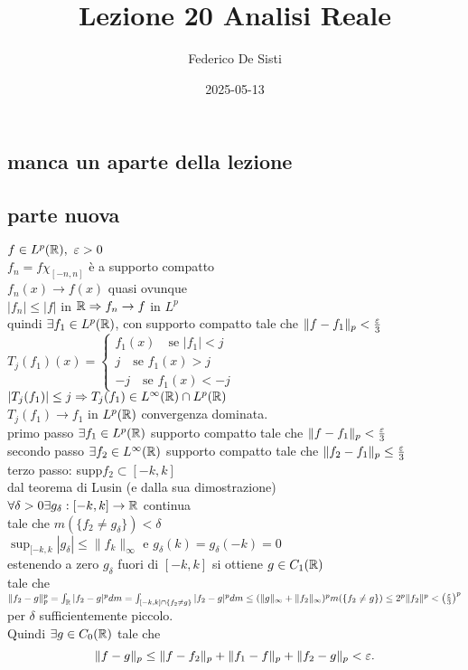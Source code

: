 \documentclass[12px]{article}
\title{Lezione 20 Analisi Reale}
\date{2025-05-13}
\author{Federico De Sisti}
\begin{document}
	\maketitle
	\newpage
	\subsection{manca un aparte della lezione}
	\subsection{parte nuova}
	\begin{dimo}
		$f\in L^p(\mathbb{R}), \ \varepsilon > 0 $\\
		$f_n = f\chi_{[-n,n]}$ è a supporto compatto\\
		 $f_n(x) \rightarrow f(x)$ quasi ovunque\\
		 $|f_n| \leq |f|$ in  $\mathbb{R} \Rightarrow  f_n \rightarrow f$ in $L^p$\\
		 quindi  $\exists  f_1\in L^p(\mathbb{R})$, con supporto compatto tale che $\|f-f_1\|_p < \frac {\varepsilon} 3$ \\
		 $T_j(f_1)(x) = \begin{cases}
			 f_1 (x)\ \ \ \text{ se } |f_1| < j\\
			 j \ \ \ \text{ se } f_1(x) > j\\
			 -j \ \ \ \text{ se } f_1(x) < -j
		 \end{cases}$\\
		 $|T_j(f_1)|\leq j \Rightarrow  T_j (f_1)\in L^\infty (\mathbb{R})\cap L^p(\mathbb{R})$ \\
		 $T_j(f_1) \rightarrow f_1$ in $L^p(\mathbb{R})$ convergenza dominata.\\
		 primo passo  $\exists f_1\in L^p(\mathbb{R})$ supporto compatto tale che $\|f-f_1\|_p < \frac {\varepsilon} 3$\\
		 secondo passo $\exists f_2 \in L^\infty(\mathbb{R})$ supporto compatto tale che $\|f_2- f_1\|_p \leq \frac{\varepsilon} 3$\\
		 terzo passo: supp$f_2\subset [-k,k]$\\
		 dal teorema di Lusin (e dalla sua dimostrazione)\\
		 $\forall \delta > 0 \exists g_\delta : [-k,k] \rightarrow \mathbb{R}$ continua\\
	 tale che $m(\{f_2\neq g_\delta\}) < \delta$\\
	 $\sup_{[-k,k}|g_\delta|\leq \|f_k\|_\infty$ e  $g_\delta(k) = g_\delta(-k) = 0$\\
	 estenendo a zero $g_\delta$ fuori di  $[-k,k]$ si ottiene  $g\in C_1(\mathbb{R})$\\
	 tale che $\|f_2 - g\|_p^p = \int_{\mathbb{R}} |f_2-g|^pd m = \int_{[-k,k]\cap\{f_2\neq g\}}|f_2-g|^pd m \leq (\|g\|_\infty + \|f_2\|_\infty)^p m (\{f_2\neq g\}) \leq 2^p\|f_2\|^p < \left(\frac {\varepsilon} 3 \right)^p$ per $\delta$ sufficientemente piccolo.\\
	 Quindi  $\exists g\in C_0(\mathbb{R})$ tale che 
	 \[
	 \|f-g\|_p\leq \|f-f_2\|_p + \|f_1-f\|_p + \|f_2-g\|_p < \varepsilon
	 .\] 

	\end{dimo}
\end{document}
